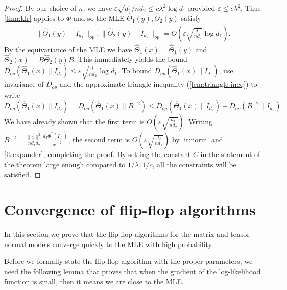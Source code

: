 \documentclass[aos]{imsart}
\theoremstyle{definition}
\numberwithin{equation}{section}
\newcommand{\htheta}{\widehat{\Theta}}
\newcommand{\eps}{\varepsilon}
\begin{document}
\begin{proof}
By our choice of $n$, we have $\eps \sqrt{d_1/nd_2} \leq c\lambda^2\log d_1$ provided $\eps \leq c\lambda^2$. Thus \cref{thm:klr} applies to $\tilde{\Phi}$ and so the MLE $\htheta_1(y), \htheta_2(y)$ satisfy
\begin{gather*} \| \htheta_1(y) - I_{d_1}\|_{op}, \| \htheta_2(y) - I_{d_2}\|_{op} = O\left(\eps \sqrt{\frac{d_1}{n d_2}} \log d_1\right).\end{gather*}
By the equivariance of the MLE we have $\htheta_1(x) = \htheta_1(y)$ and $\htheta_2(x) = B \htheta_2 (y) B$. This immediately yields the bound $ D_{op}(\htheta_1(x) \rVert I_{d_1}) \leq \eps \sqrt{\frac{d_1}{n d_2}} \log d_1.$
To bound $D_{op}(\htheta_1(x) \rVert I_{d_1})$, use invariance of $D_{op}$ and the approximate triangle inequality (\cref{lem:triangle-ineq}) to write
$$D_{op}(\htheta_1(x) \rVert I_{d_2}) = D_{op}(\htheta_1(x) \rVert B^{-2}) \leq D_{op}(\htheta_1(x)\rVert I_{d_2}) + D_{op}(B^{-2}\rVert I_{d_2}).$$
We have already shown that the first term is $O(\eps \sqrt{\frac{d_1}{n d_2}}).$ Writing $B^{-2} = \frac{\|x\|^2}{nd_1 d_2} \frac{d_2 \Phi^*(I_{d_1})}{\|x\|^2}$, the second term is $O(\eps \sqrt{\frac{d_2}{n d_1}})$ by \cref{it:norm} and \cref{it:expander}, completing the proof.  By setting the constant $C$ in the statement of the theorem large enough compared to $1/\lambda, 1/c$, all the constraints will be satisfied.
\end{proof}









\section{Convergence of flip-flop algorithms}

In this section we prove that the flip-flop algorithms for the matrix and tensor normal models converge quickly to the MLE with high probability. 

Before we formally state the flip-flop algorithm with the proper parameters, we need the following lemma that proves that when the gradient of the log-likelihood function is small, then it means we are close to the MLE.
\end{document}
